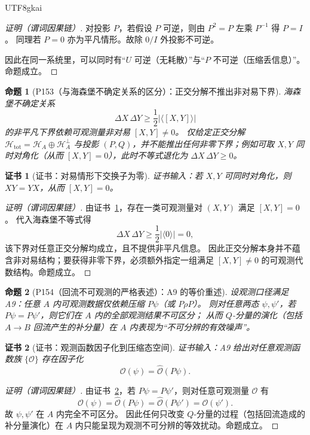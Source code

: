 \documentclass[12pt]{article}
\newtheorem{proposition}{命题}[section]
\newtheorem{Certificate}{证书}[section]
\begin{document}
\begin{CJK*}{UTF8}{gkai}
\begin{proof}[证明（谓词因果链）]
对投影 $P$，若假设 $P$ 可逆，则由 $P^2=P$ 左乘 $P^{-1}$ 得 $P=I$。
同理若 $P=0$ 亦为平凡情形。故除 $0/I$ 外投影不可逆。

因此在同一系统里，可以同时有“$U$ 可逆（无耗散）”与“$P$ 不可逆（压缩丢信息）”。命题成立。
\end{proof}

\begin{proposition}[P153（与海森堡不确定关系的区分）：正交分解不推出非对易下界]
\label{prop:P22}
海森堡不确定关系
\[
\Delta X\,\Delta Y\ge \frac12\big|\langle [X,Y]\rangle\big|
\]
的非平凡下界依赖可观测量非对易 $[X,Y]\neq 0$。
仅给定正交分解 $\mathcal H_{\mathrm{tot}}=\mathcal H_A\oplus\mathcal H_A^\perp$ 与投影 $(P,Q)$，并不能推出任何非零下界；例如可取 $X,Y$ 同时对角化（从而 $[X,
  Y]=0$），此时不等式退化为 $\Delta X\,\Delta Y\ge 0$。
\end{proposition}

\begin{Certificate}[证书：对易情形下交换子为零]
\label{cert:P22}
证书输入：若 $X,Y$ 可同时对角化，则 $XY=YX$，从而 $[X,Y]=0$。
\end{Certificate}

\begin{proof}[证明（谓词因果链）]
由证书~\ref{cert:P22}，存在一类可观测量对 $(X,Y)$ 满足 $[X,Y]=0$。
代入海森堡不等式得
\[
\Delta X\,\Delta Y\ge \frac12|\langle 0\rangle|=0,
\]
该下界对任意正交分解均成立，且不提供非平凡信息。
因此正交分解本身并不蕴含非对易结构；要获得非零下界，必须额外指定一组满足 $[X,Y]\neq 0$ 的可观测代数结构。命题成立。
\end{proof}

\begin{proposition}[P154（回流不可观测的严格表述）：A9 的等价重述]
\label{prop:P23}
设观测口径满足 A9：任意 $A$ 内可观测数据仅依赖压缩 $P\psi$（或 $P\rho P$）。
则对任意两态 $\psi,\psi'$，若 $P\psi=P\psi'$，则它们在 $A$ 内的全部观测结果不可区分；
从而 $Q$-分量的演化（包括 $A\to B$ 回流产生的补分量）在 $A$ 内表现为“不可分辨的有效噪声”。
\end{proposition}

\begin{Certificate}[证书：观测函数因子化到压缩态空间]
\label{cert:P23}
证书输入：A9 给出对任意观测函数族 $\{\mathcal O\}$ 存在因子化
\[
\mathcal O(\psi)=\widehat{\mathcal O}(P\psi).
\]
\end{Certificate}

\begin{proof}[证明（谓词因果链）]
由证书~\ref{cert:P23}，若 $P\psi=P\psi'$，则对任意可观测量 $\mathcal O$ 有
\[
\mathcal O(\psi)=\widehat{\mathcal O}(P\psi)=\widehat{\mathcal O}(P\psi')=\mathcal O(\psi').
\]
故 $\psi,\psi'$ 在 $A$ 内完全不可区分。
因此任何只改变 $Q$-分量的过程（包括回流造成的补分量演化）在 $A$ 内只能呈现为观测不可分辨的等效扰动。命题成立。
\end{proof}


\end{CJK*}
\end{document}
